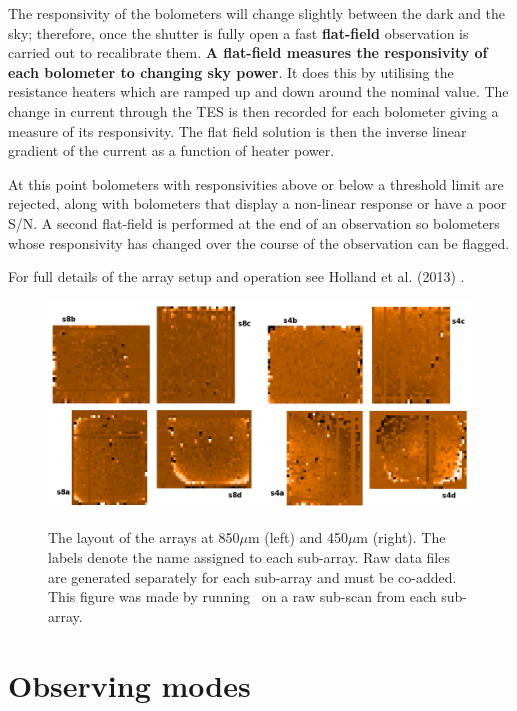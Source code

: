 \documentclass[11pt,oneside,chapters]{starlink}
\begin{document}
The responsivity of the bolometers will change slightly between the
dark and the sky; therefore, once the shutter is fully open a fast
\textbf{flat-field} observation is carried out to recalibrate them.
\textbf{A flat-field measures the responsivity of each bolometer to
changing sky power}. It does this by utilising the resistance heaters
which are ramped up and down around the nominal value. The change in
current through the TES is then recorded for each bolometer giving a
measure of its responsivity. The flat field solution is then the
inverse linear gradient of the current as a function of heater power.

At this point bolometers with responsivities above or below a
threshold limit are rejected, along with bolometers that display a
non-linear response or have a poor S/N. A second flat-field is
performed at the end of an observation so bolometers whose
responsivity has changed over the course of the observation can be
flagged.

For full details of the array setup and operation see Holland et al.
(2013) \cite{s2main}.

\begin{figure}[t!]
\begin{center}
\includegraphics[width=0.8\linewidth]{sc21_arrays}
\label{fig:arrays}
\caption[The physical layout of the arrays at each wavelength]{
  \small The layout of the arrays at 850$\mu$m (left) and
  450$\mu$m (right). The labels denote the name assigned to each
  sub-array. Raw data files are generated separately for each sub-array
  and must be co-added. This figure was made by running
 \wcsmosaic\ on a raw sub-scan from each sub-array.
}
\end{center}
\end{figure}

\section{Observing modes}
\label{sec:mmodes}
\end{document}
